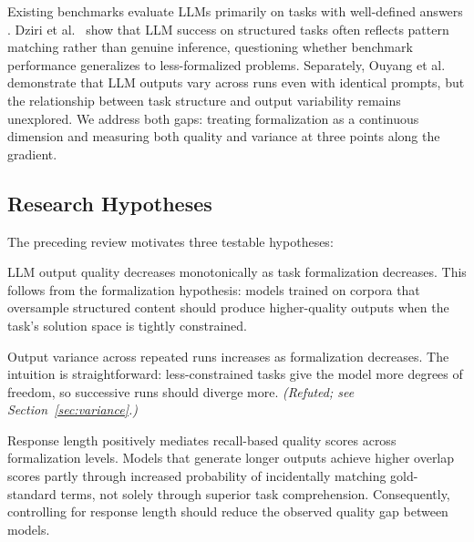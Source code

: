 \documentclass[runningheads]{llncs}
\begin{document}
Existing benchmarks evaluate LLMs primarily on tasks with well-defined answers \cite{rajpurkar2016squad,chen2021evaluating}. Dziri et al.\ \cite{dziri2023faith} show that LLM success on structured tasks often reflects pattern matching rather than genuine inference, questioning whether benchmark performance generalizes to less-formalized problems. Separately, Ouyang et al.\ \cite{ouyang2023llm} demonstrate that LLM outputs vary across runs even with identical prompts, but the relationship between task structure and output variability remains unexplored. We address both gaps: treating formalization as a continuous dimension and measuring both quality and variance at three points along the gradient.

\subsection{Research Hypotheses}
\label{sec:hypotheses}

The preceding review motivates three testable hypotheses:

\begin{description}[noitemsep,leftmargin=2em,style=nextline]
  \item[H1: Quality gradient.] 
  LLM output quality decreases monotonically as task formalization decreases. This follows from the formalization hypothesis: models trained on corpora that oversample structured content should produce higher-quality outputs when the task's solution space is tightly constrained.

  \item[H2: Variance gradient.]
    Output variance across repeated runs increases as formalization decreases. The intuition is straightforward: less-constrained tasks give the model more degrees of freedom, so successive runs should diverge more. \emph{(Refuted; see Section~\ref{sec:variance}.)}

  \item[H3: Length--quality mediation.]
    Response length positively mediates recall-based quality scores across formalization levels. Models that generate longer outputs achieve higher overlap scores partly through increased probability of incidentally matching gold-standard terms, not solely through superior task comprehension. Consequently, controlling for response length should reduce the observed quality gap between models.
\end{description}
\end{document}
